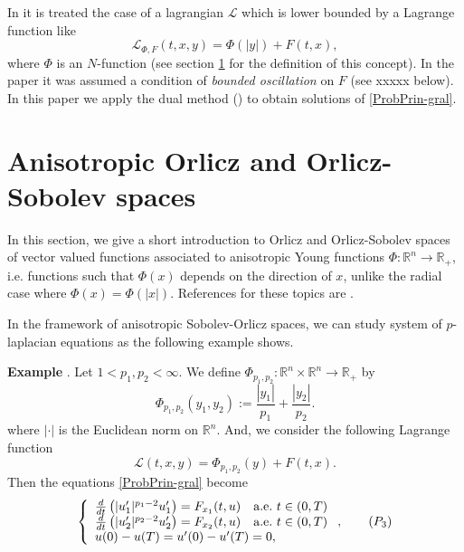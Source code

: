 \documentclass[twoside]{article}
\theoremstyle{remark}
\newcommand{\rr}{\mathbb{R}}
\newcounter{example}
\newenvironment{example}{\noindent\textbf{Example \arabic{example}}.}{\addtocounter{example}{1}}
\begin{document}
In \cite{ABGMS2015} it is treated  the case of a lagrangian $\mathcal{L}$ which is lower bounded by a Lagrange function like
\begin{equation}\label{eq:lagrange_phi}
\mathcal{L}_{\Phi,F}(t,x,y)=\Phi(|y|)+F(t,x),
\end{equation}
where  $\Phi$ is an $N$-function (see section \ref{preliminares} for the definition of this concept).  
In the paper \cite{ABGMS2015} it was assumed  a condition of \emph{bounded oscillation} on $F$  (see xxxxx below). 
In this paper  we apply the dual method (\cite[Ch. 3]{mawhin2010critical}) to obtain solutions of \eqref{ProbPrin-gral}.



\section{Anisotropic Orlicz and Orlicz-Sobolev spaces}\label{preliminares}

In this section, we give a short introduction to  Orlicz and Orlicz-Sobolev spaces of vector valued functions associated to anisotropic Young functions $\Phi:\rr^n\to\rr_+$, i.e. functions such that $\Phi(x)$ depends on the direction of $x$, unlike the radial case where $\Phi(x)=\Phi(|x|)$.  References for  these topics are \cite{Orliczvectorial2005,Skaff1969, Desch2001}.

In the framework of anisotropic Sobolev-Orlicz spaces, we can study system of $p$-laplacian equations as the following example shows.


\begin{example}\label{ex:phip1p2} Let $1<p_1,p_2<\infty$. We define $\Phi_{p_1,p_2}:\rr^n\times \rr^n\to\rr_+$   by
\[\Phi_{p_1,p_2}(y_1,y_2):=\frac{|y_1|}{p_1}+\frac{|y_2|}{p_2}.\]
where $|\cdot|$ is the Euclidean norm on $\rr^n$.
And, we consider the following Lagrange function
\[\mathcal{L}(t,x,y)=\Phi_{p_1,p_2}(y)+F(t,x).\]
Then the equations \eqref{ProbPrin-gral} become
\begin{equation}\label{eq:sist-p_lapa}
    \left\{%
\begin{array}{ll}
  \frac{d}{dt}\left(|u_1'|^{p_1-2}u_1'\right)=F_{x_1}(t,u) \quad \hbox{a.e.}\ t \in (0,T)\\
  \frac{d}{dt}\left(|u_2'|^{p_2-2}u_2'\right)=F_{x_2}(t,u) \quad \hbox{a.e.}\ t \in (0,T)\\
   u(0)-u(T)=u'(0)-u'(T)=0,
\end{array}%
\right., \tag{$P_3$}
\end{equation}



\end{example}
\end{document}
